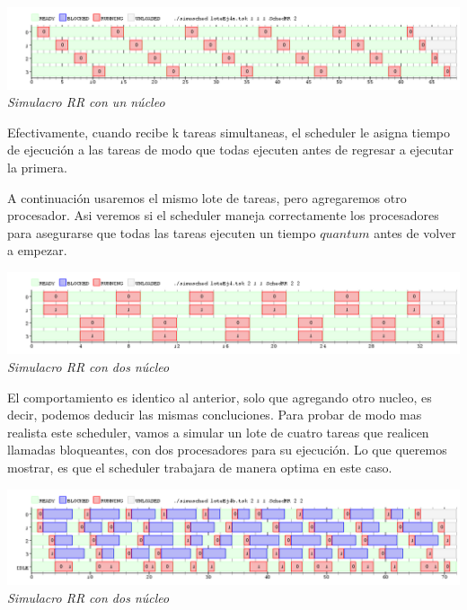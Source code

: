 \vspace{\baselineskip}
\begin{center}
\includegraphics[scale=0.45]{../tp1/Test/resEj4Co1SB.png}
\\
\vspace{1pt}
\footnotesize\textit{Simulacro RR con un n\'ucleo}
\end{center}
\vspace{\baselineskip}

Efectivamente, cuando recibe k tareas simultaneas, el scheduler le asigna tiempo de ejecuci\'on a las tareas de modo que todas 
ejecuten antes de regresar a ejecutar la primera. 

A continuaci\'on usaremos el mismo lote de tareas, pero agregaremos otro procesador. Asi veremos si el scheduler maneja correctamente 
los procesadores para asegurarse que todas las tareas ejecuten un tiempo $quantum$ antes de volver a empezar.

\vspace{\baselineskip}
\begin{center}
\includegraphics[scale=0.45]{../tp1/Test/resEj4Co2SB.png}
\\
\vspace{1pt}
\footnotesize\textit{Simulacro RR con dos n\'ucleo}
\end{center}
\vspace{\baselineskip}

El comportamiento es identico al anterior, solo que agregando otro nucleo, es decir, podemos deducir las mismas concluciones. Para probar de 
modo mas realista este scheduler, vamos a simular un lote de cuatro tareas que realicen llamadas bloqueantes, con dos procesadores para su ejecuci\'on.
Lo que queremos mostrar, es que el scheduler trabajara de manera optima en este caso.

\vspace{\baselineskip}
\begin{center}
\includegraphics[scale=0.45]{../tp1/Test/resEj4Co2CB.png}
\\
\vspace{1pt}
\footnotesize\textit{Simulacro RR con dos n\'ucleo}
\end{center}
\vspace{\baselineskip}

